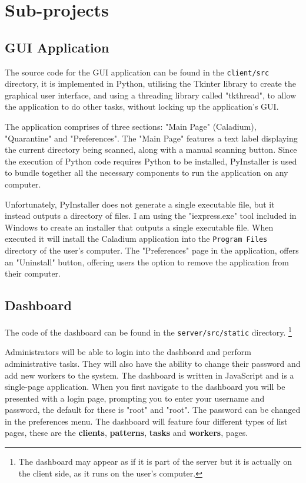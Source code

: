 \section{Sub-projects}
\subsection{GUI Application}
The source code for the GUI application can be found in
the \texttt{client/src} directory, it is implemented in Python,
utilising the Tkinter library to create the graphical user interface,
and using a threading library called "tkthread",
to allow the application to do other tasks,
without locking up the application's GUI.

The application comprises of three sections:
"Main Page" (Caladium), "Quarantine" and "Preferences".
The "Main Page" features a text label displaying
the current directory being scanned,
along with a manual scanning button.
Since the execution of Python code requires Python to be installed,
PyInstaller is used to bundle together all the
necessary components to run the application on any computer.

Unfortunately, PyInstaller does not generate a single executable file,
but it instead outputs a directory of files.
I am using the "iexpress.exe" tool included in Windows to
create an installer that outputs a single executable file.
When executed it will install the Caladium application
into the \texttt{Program Files} directory of the user's computer.
The "Preferences" page in the application, offers an "Uninstall" button,
offering users the option to remove the application from their computer.

\subsection{Dashboard}
The code of the dashboard can be found in the \texttt{server/src/static} directory.
\footnote{The dashboard may appear as if it is part of the server
but it is actually on the client side, as it runs on the user's computer.}

Administrators will be able to login into the dashboard
and perform administrative tasks.
They will also have the ability to change their
password and add new workers to the system.
The dashboard is written in JavaScript and is a single-page application.
When you first navigate to the dashboard you will be presented with a login page,
prompting you to enter your username and password,
the default for these is "root" and "root".
The password can be changed in the preferences menu.
The dashboard will feature four different types of list pages,
these are the \textbf{clients}, \textbf{patterns},
\textbf{tasks} and \textbf{workers}, pages.

